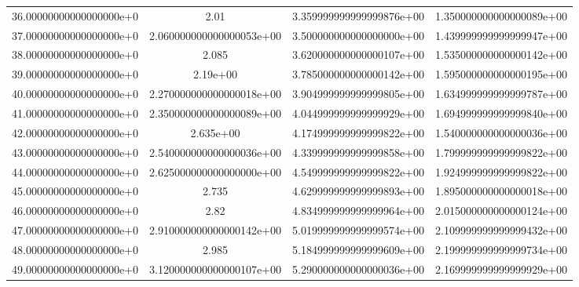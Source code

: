 \begin{table}
\begin{tabular}{S S S S}
    36.00000000000000000e+0 & 2.01                     & 3.359999999999999876e+00 & 1.350000000000000089e+00\\
    37.00000000000000000e+0 & 2.060000000000000053e+00 & 3.500000000000000000e+00 & 1.439999999999999947e+00\\
    38.00000000000000000e+0 & 2.085                    & 3.620000000000000107e+00 & 1.535000000000000142e+00\\
    39.00000000000000000e+0 & 2.19e+00                 & 3.785000000000000142e+00 & 1.595000000000000195e+00\\
    40.00000000000000000e+0 & 2.270000000000000018e+00 & 3.904999999999999805e+00 & 1.634999999999999787e+00\\
    41.00000000000000000e+0 & 2.350000000000000089e+00 & 4.044999999999999929e+00 & 1.694999999999999840e+00\\
    42.00000000000000000e+0 & 2.635e+00                & 4.174999999999999822e+00 & 1.540000000000000036e+00\\
    43.00000000000000000e+0 & 2.540000000000000036e+00 & 4.339999999999999858e+00 & 1.799999999999999822e+00\\
    44.00000000000000000e+0 & 2.625000000000000000e+00 & 4.549999999999999822e+00 & 1.924999999999999822e+00\\
    45.00000000000000000e+0 & 2.735                    & 4.629999999999999893e+00 & 1.895000000000000018e+00\\
    46.00000000000000000e+0 & 2.82                     & 4.834999999999999964e+00 & 2.015000000000000124e+00\\
    47.00000000000000000e+0 & 2.910000000000000142e+00 & 5.019999999999999574e+00 & 2.109999999999999432e+00\\
    48.00000000000000000e+0 & 2.985                    & 5.184999999999999609e+00 & 2.199999999999999734e+00\\
    49.00000000000000000e+0 & 3.120000000000000107e+00 & 5.290000000000000036e+00 & 2.169999999999999929e+00\\
    \bottomrule
  \end{tabular}
\end{table}

